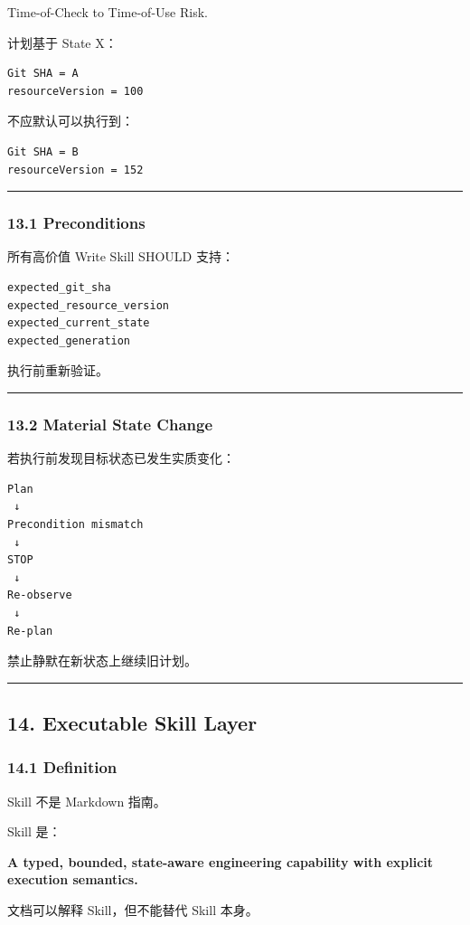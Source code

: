 \documentclass[11pt,a4paper]{article}
\begin{document}
\begin{gfmBlockquote}
Time-of-Check to Time-of-Use Risk.
\end{gfmBlockquote}
计划基于 State X：

\begin{lstlisting}[language=text]
Git SHA = A
resourceVersion = 100
\end{lstlisting}
不应默认可以执行到：

\begin{lstlisting}[language=text]
Git SHA = B
resourceVersion = 152
\end{lstlisting}
\vspace{0.5em}\hrule\vspace{0.5em}
\subsubsection{13.1 Preconditions}
所有高价值 Write Skill SHOULD 支持：

\begin{lstlisting}[language=text]
expected_git_sha
expected_resource_version
expected_current_state
expected_generation
\end{lstlisting}
执行前重新验证。

\vspace{0.5em}\hrule\vspace{0.5em}
\subsubsection{13.2 Material State Change}
若执行前发现目标状态已发生实质变化：

\begin{lstlisting}[language=text]
Plan
 ↓
Precondition mismatch
 ↓
STOP
 ↓
Re-observe
 ↓
Re-plan
\end{lstlisting}
禁止静默在新状态上继续旧计划。

\vspace{0.5em}\hrule\vspace{0.5em}
\subsection{14. Executable Skill Layer}
\subsubsection{14.1 Definition}
Skill 不是 Markdown 指南。

Skill 是：

\begin{gfmBlockquote}
\textbf{A typed, bounded, state-aware engineering capability with explicit execution semantics.}
\end{gfmBlockquote}
文档可以解释 Skill，但不能替代 Skill 本身。
\end{document}
